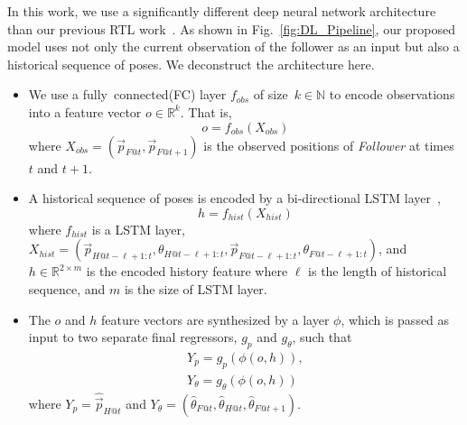 \documentclass[letterpaper, 10 pt, conference]{ieeeconf}  %
\begin{document}
    In this work, we use a significantly different deep neural network
    architecture than our previous RTL work~\cite{CPR17}. As shown in
    Fig.~\ref{fig:DL_Pipeline}, our proposed model uses not only the
    current observation of the follower as an input but also a
    historical sequence of poses. We deconstruct the architecture here.
    \begin{itemize}
        \item We use a fully~connected(FC) layer $f_{obs}$ of size~$k
            \in \mathbb{N}$ to encode
            observations into a feature vector $o \in \mathbb{R}^k$.
            That is,
            \begin{equation}
                o = f_{obs}(X_{obs})
            \end{equation}
            where $X_{obs} = (\vec{p}_{F@t},\vec{p}_{F@t+1})$ is the
            observed positions of \emph{Follower} at times $t$ and $t+1$.

        \item A historical sequence of poses is encoded by a
            bi-directional LSTM layer~\cite{Wu16},
            \begin{equation}
                h = f_{hist}(X_{hist})
            \end{equation}
            where $f_{hist}$ is a LSTM layer, $X_{hist} =
            (\vec{p}_{H@t-\ell+1:t}, \theta_{H@t-\ell+1:t},
            \vec{p}_{F@t-\ell+1:t}, \theta_{F@t-\ell+1:t})$, and $h \in
            \mathbb{R}^{2 \times m}$ is the encoded history feature
            where $\ell$ is the length of historical sequence, and $m$ is
            the size of LSTM layer.

        \item The $o$ and $h$ feature vectors are synthesized by a layer
           $\phi$, which is passed as input to two separate final
           regressors, $g_{p}$ and $g_\theta$, such that
            \begin{equation}
                \begin{split}
                Y_{p} = g_{p}(\phi(o, h)),\\
                Y_{\theta}= g_{\theta}(\phi(o, h))
                \end{split}
                \label{eq:regression_output}
            \end{equation}
            where $Y_{p} = \hat{\vec{p}}_{H@t}$ and $Y_{\theta} =
            (\hat{\theta}_{F@t}, \hat{\theta}_{H@t},
            \hat{\theta}_{F@t+1})$.


\end{itemize}
\end{document}
